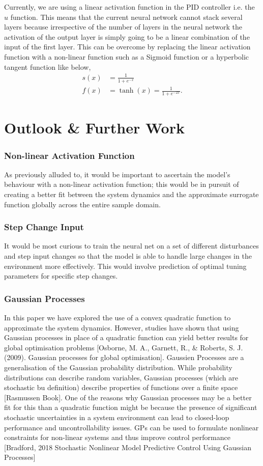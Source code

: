 \documentclass[conference]{IEEEtran}
\theoremstyle{definition}
\begin{document}
Currently, we are using a linear activation function in the PID controller i.e. the $u$ function. This means that the current neural network cannot stack several layers because irrespective of the number of layers in the neural network the activation of the output layer is simply going to be a linear combination of the input of the first layer. This can be overcome by replacing the linear activation function with a non-linear function such as a Sigmoid function or a hyperbolic tangent function like below, 
\begin{align}
    s(x) &= \frac{1}{1 + e^{-x}} \\
    f(x) &= \tanh(x) = \frac{1}{1+e^{-2x}}.
\end{align}
\section{Outlook \& Further Work}
\subsubsection{Non-linear Activation Function}
As previously alluded to, it would be important to ascertain the model's behaviour with a non-linear activation function; this would be in pursuit of creating a better fit between the system dynamics and the approximate surrogate function globally across the entire sample domain.
\subsubsection{Step Change Input}
It would be most curious to train the neural net on a set of different disturbances and step input changes so that the model is able to handle large changes in the environment more effectively. This would involve prediction of optimal tuning parameters for specific step changes. 
\subsubsection{Gaussian Processes}
In this paper we have explored the use of a convex quadratic function to approximate the system dynamics. However, studies have shown that using Gaussian processes in place of a quadratic function can yield better results for global optimisation problems [Osborne, M. A., Garnett, R., \& Roberts, S. J. (2009). Gaussian processes for global optimisation]. Gaussien Processes are a generalisation of the Gaussian probability distribution. While probability distributions can describe random variables, Gaussian processes (which are stochastic bu definition) describe properties of functions over a finite space [Rasmussen Book]. One of the reasons why Gaussian processes may be a better fit for this than a quadratic function might be because the presence of significant stochastic uncertainties in a system environment can lead to closed-loop performance and uncontrollability issues. GPs can be used to formulate nonlinear constraints for non-linear systems and thus improve control performance [Bradford, 2018  Stochastic Nonlinear Model Predictive Control Using Gaussian Processes]
\end{document}

